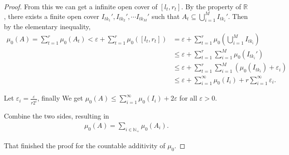 \begin{proof}[Proof]
    From this we can get a infinite open cover of $[l_t, r_t]$. By the property of $\mathbb{R} $, there exists a finite open cover $I_{tk_1}', I_{tk_2}',\cdots I_{tk_M}'$ such that $A_t \subseteq \bigcup_{i=1}^M I_{tk_i}'$. Then by the elementary inequality, 
    \begin{align*}
        \mu_0(A) = \sum_{t=1}^r \mu_0(A_t) < \varepsilon + \sum_{t=1}^r \mu_0([l_t, r_t]) &= \varepsilon + \sum_{t=1}^r \mu_0(\bigcup_{i=1}^M I_{tk_i}) \\
                                                                                          &\le \varepsilon + \sum_{t=1}^r \sum_{i=1}^M \mu_0(I_{tk_i}')  \\
                                                                                          &\le \varepsilon + \sum_{t=1}^r \sum_{i=1}^M (\mu_0(I_{tk_i}) + \varepsilon_i)  \\
                                                                                          &\le \varepsilon + \sum_{i=1}^\infty \mu_0(I_i) + r\sum_{i=1}^\infty \varepsilon_i
   .\end{align*}

   Let $\varepsilon _i = \frac{\varepsilon}{r2^i}$, finally We get $\mu_0(A) \le \sum _{i=1}^\infty \mu_0(I_i) + 2\varepsilon $ for all $\varepsilon > 0$.

   Combine the two sides, resulting in 
    \begin{align*}
        \mu_0(A) = \sum _{i\in\mathbb{N} _+} \mu_0(A_i)
    .\end{align*}

    That finished the proof for the countable additivity of $\mu_0$.

\end{proof}



